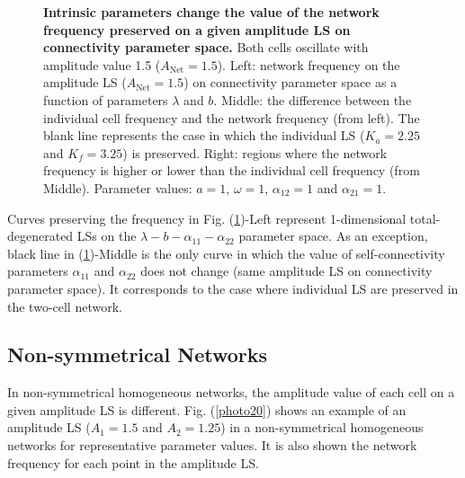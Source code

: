 \begin{figure}[h]
\begin{minipage}{0.32\linewidth}
\begin{center}
            \end{center}
        \end{minipage} 
  \caption{\textbf{Intrinsic parameters change the value of the network frequency preserved on a given amplitude LS on connectivity parameter space.} Both cells oscillate with amplitude value 1.5 ($A_{\text{Net}} = 1.5$). Left: network frequency on the amplitude LS ($A_{\text{Net}} = 1.5$) on connectivity parameter space as a function of parameters $\lambda$ and $b$. Middle: the difference between the individual cell frequency and the network frequency (from left). The blank line represents the case in which the individual LS ($K_{a}=2.25$ and $K_{f} = 3.25$) is preserved. Right: regions where the network frequency is higher or lower than the individual cell frequency (from Middle). Parameter values: $a = 1$, $\omega = 1$, $\alpha_{12} = 1$ and $\alpha_{21}=1$.}
  \label{photo19}
\end{figure}

Curves preserving the frequency in Fig. (\ref{photo19})-Left represent 1-dimensional total-degenerated LSs on the $\lambda-b-\alpha_{11}-\alpha_{22}$ parameter space. As an exception, black line in (\ref{photo19})-Middle is the only curve in which the value of self-connectivity parameters $\alpha_{11}$ and $\alpha_{22}$ does not change (same amplitude LS on connectivity parameter space). It corresponds to the case where individual LS are preserved in the two-cell network. 

\subsection{Non-symmetrical Networks}
In non-symmetrical homogeneous networks, the amplitude value of each cell on a given amplitude LS is different. Fig. (\ref{photo20}) shows an example of an amplitude LS ($A_{1} = 1.5$ and $A_{2}=1.25$) in a non-symmetrical homogeneous networks for representative parameter values. It is also shown the network frequency for each point in the amplitude LS.

